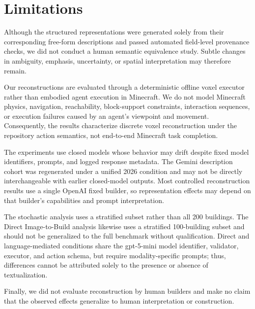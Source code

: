 \section{Limitations}\par
Although the structured representations were generated solely from their corresponding free-form descriptions and passed automated field-level provenance checks, we did not conduct a human semantic equivalence study. Subtle changes in ambiguity, emphasis, uncertainty, or spatial interpretation may therefore remain.\par
Our reconstructions are evaluated through a deterministic offline voxel executor rather than embodied agent execution in Minecraft. We do not model Minecraft physics, navigation, reachability, block-support constraints, interaction sequences, or execution failures caused by an agent's viewpoint and movement. Consequently, the results characterize discrete voxel reconstruction under the repository action semantics, not end-to-end Minecraft task completion.\par
The experiments use closed models whose behavior may drift despite fixed model identifiers, prompts, and logged response metadata. The Gemini description cohort was regenerated under a unified 2026 condition and may not be directly interchangeable with earlier closed-model outputs. Most controlled reconstruction results use a single OpenAI fixed builder, so representation effects may depend on that builder's capabilities and prompt interpretation.\par
The stochastic analysis uses a stratified subset rather than all 200 buildings. The Direct Image-to-Build analysis likewise uses a stratified 100-building subset and should not be generalized to the full benchmark without qualification. Direct and language-mediated conditions share the gpt-5-mini model identifier, validator, executor, and action schema, but require modality-specific prompts; thus, differences cannot be attributed solely to the presence or absence of textualization.\par
Finally, we did not evaluate reconstruction by human builders and make no claim that the observed effects generalize to human interpretation or construction.
